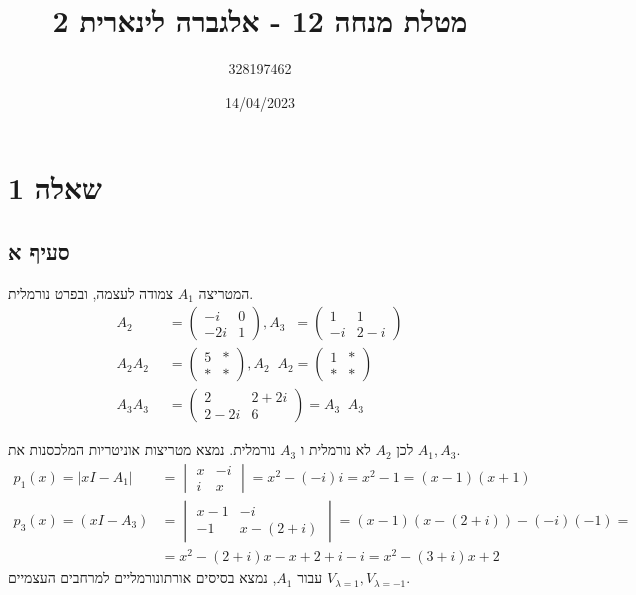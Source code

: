 \documentclass{article}
\title{מטלת מנחה 12 - אלגברה לינארית 2}
\author{328197462}
\date{14/04/2023}
\DeclareMathOperator{\adj}{^\ast}
\begin{document}
\maketitle

\section*{שאלה 1}
\subsection*{סעיף א}

המטריצה $A_1$ צמודה לעצמה, ובפרט נורמלית.
\begin{align*}
    A_2 \adj    & = \begin{pmatrix}
                        -i  & 0 \\
                        -2i & 1
                    \end{pmatrix},
    A_3 \adj = \begin{pmatrix}
                   1  & 1   \\
                   -i & 2-i
               \end{pmatrix}                                    \\
    A_2A_2 \adj & = \begin{pmatrix}
                        5    & \ast \\
                        \ast & \ast
                    \end{pmatrix}, A_2 \adj A_2 = \begin{pmatrix}
                                                      1    & \ast \\
                                                      \ast & \ast
                                                  \end{pmatrix} \\
    A_3A_3 \adj & = \begin{pmatrix}
                        2    & 2+2i \\
                        2-2i & 6
                    \end{pmatrix} = A_3 \adj A_3
\end{align*}

לכן $A_2$ לא נורמלית ו $A_3$ נורמלית. נמצא מטריצות אוניטריות המלכסנות את $A_1, A_3$.
\begin{align*}
    p_1(x)=|xI-A_1| & =\begin{vmatrix}
                           x & -i \\
                           i & x
                       \end{vmatrix} = x^2-(-i)i = x^2 -1 = (x-1)(x+1) \\
    p_3(x)=(xI-A_3) & = \begin{vmatrix}
                            x-1 & -i      \\
                            -1  & x-(2+i)
                        \end{vmatrix} = (x-1)(x-(2+i))-(-i)(-1) =      \\
                    & = x^2-(2+i)x-x+2+i-i= x^2-(3+i)x+2
\end{align*}
עבור $A_1$, נמצא בסיסים אורתונורמליים למרחבים העצמיים $V_{\lambda=1}, V_{\lambda=-1}$.
\end{document}
